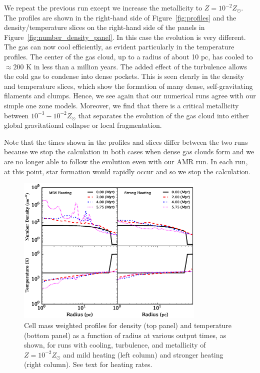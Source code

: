 \documentclass[useAMS,usenatbib]{mn2e}
\begin{document}
We repeat the previous run except we increase the metallicity to $Z=10^{-2}Z_\odot$.  The profiles are shown
in the right-hand side of Figure~\ref{fig:profiles} and the density/temperature slices on the right-hand side of the panels in Figure~\ref{fig:number_density_panel}.  In this case the evolution is very different.
The gas can now cool efficiently, as evident particularly in the temperature profiles.   The center
of the gas cloud, up to a radius of about 10 pc, has cooled to $\approx 200$ K in less than a million years. The added effect of the turbulence
allows the cold gas to condense into dense pockets.  This is seen clearly in the density and temperature slices, which show the formation of many dense, self-gravitating filaments and clumps.  
Hence, we see again that our numerical runs agree with our simple one zone models. Moreover, we find that there is a critical metallicity
between $10^{-3}-10^{-2}Z_\odot$ that separates the evolution of the gas cloud into either global gravitational collapse or local fragmentation. 

Note that the times shown in the profiles and slices differ between the two runs because we stop the calculation in both cases when dense gas clouds form and we are no longer able to follow the evolution even with our AMR run.  In each run, at this point, star formation would rapidly occur and so we stop the calculation.

\begin{figure}
\begin{center}
\includegraphics[width=9.0cm]{Images/profile_heating}
\end{center}
\caption{\label{fig:profiles_heating} Cell mass weighted profiles for 
density (top panel) and temperature (bottom panel) as a function of radius at various 
output times, as shown, for runs with cooling, turbulence, and metallicity of $Z=10^{-2}Z_\odot$
and mild heating (left column) and stronger heating (right column).  See text for heating rates.}
\end{figure}
\end{document}
